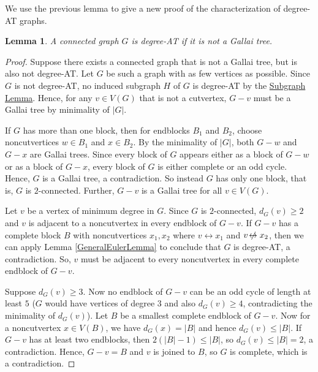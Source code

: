 \documentclass[12pt]{article}
\theoremstyle{plain}
\newtheorem{lem}[thm]{Lemma}
\theoremstyle{definition}
\theoremstyle{remark}
\newcommand{\set}[1]{\left\{ #1 \right\}}
\def\adj{\leftrightarrow}
\def\nonadj{\not\!\leftrightarrow}
\begin{document}
We use the previous lemma to give a new proof of the characterization of
degree-AT graphs.
\begin{lem}
\label{DegreeATClassification}
A connected graph $G$ is degree-AT if it is not a Gallai tree.
\end{lem}
\begin{proof}
Suppose there exists a connected graph that is not a Gallai tree, but is also not
degree-AT.  Let $G$ be such a graph with as few vertices as possible.
Since $G$ is not degree-AT, no induced subgraph $H$ of $G$ is
degree-AT by the \hyperref[InducedSubgraph]{Subgraph Lemma}. 
Hence, for any $v \in V(G)$ that is not a cutvertex, $G-v$ must be a Gallai
tree by minimality of $|G|$.  
	
If $G$ has more than one block, then for endblocks $B_1$ and $B_2$, choose
noncutvertices $w\in B_1$ and $x\in B_2$.  By the minimality of $|G|$, both
$G-w$ and $G-x$ are Gallai trees.  Since every block of $G$ appears either as a
block of $G-w$ or as a block of $G-x$, every block of $G$ is either complete or
an odd cycle.  Hence, $G$ is a Gallai tree, a contradiction.  So instead $G$
has only one block, that is, $G$ is $2$-connected.  Further, $G-v$ is a Gallai
tree for all $v \in V(G)$.
	
Let $v$ be a vertex of minimum degree in $G$.  Since $G$ is $2$-connected,
$d_G(v) \ge 2$ and $v$ is adjacent to a noncutvertex in every endblock of $G-v$.
If $G-v$ has a complete block $B$ with noncutvertices $x_1,x_2$ where $v \adj
x_1$ and $v \nonadj x_2$, then we can apply Lemma \ref{GeneralEulerLemma} 
to conclude that $G$ is degree-AT, a
contradiction.  So, $v$ must be adjacent to every noncutvertex in every
complete endblock of $G-v$.
	
Suppose $d_G(v) \ge 3$.  Now no endblock of $G-v$ can be an odd cycle of
length at least $5$ ($G$ would have vertices of degree $3$ and also $d_G(v) \ge
4$, contradicting the minimality of $d_G(v)$).  Let $B$ be a smallest complete
endblock of $G-v$.  Now for a noncutvertex $x \in V(B)$, we have $d_G(x) =
|B|$ and hence $d_G(v) \le |B|$. 
If $G-v$ has at least two endblocks, then $2(|B|-1) \le |B|$, so $d_G(v)
\le |B| = 2$, a contradiction.  Hence, $G-v = B$ and $v$ is joined to $B$, so
$G$ is complete, which is a contradiction.
	

\end{proof}
\end{document}
